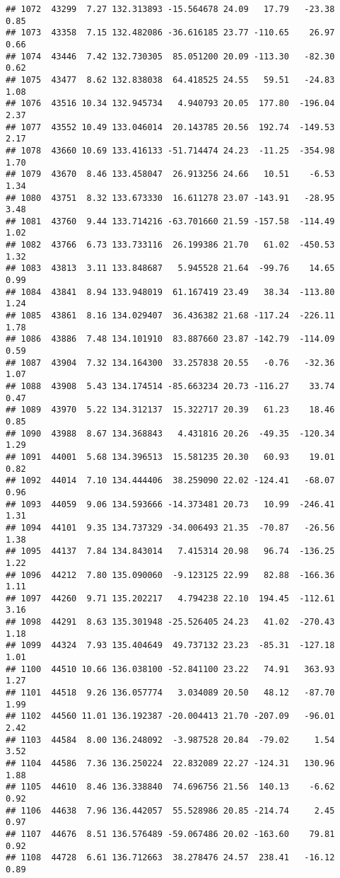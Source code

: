 \documentclass[]{article}
\begin{document}
\begin{verbatim}
## 1072  43299  7.27 132.313893 -15.564678 24.09   17.79   -23.38  0.85
## 1073  43358  7.15 132.482086 -36.616185 23.77 -110.65    26.97  0.66
## 1074  43446  7.42 132.730305  85.051200 20.09 -113.30   -82.30  0.62
## 1075  43477  8.62 132.838038  64.418525 24.55   59.51   -24.83  1.08
## 1076  43516 10.34 132.945734   4.940793 20.05  177.80  -196.04  2.37
## 1077  43552 10.49 133.046014  20.143785 20.56  192.74  -149.53  2.17
## 1078  43660 10.69 133.416133 -51.714474 24.23  -11.25  -354.98  1.70
## 1079  43670  8.46 133.458047  26.913256 24.66   10.51    -6.53  1.34
## 1080  43751  8.32 133.673330  16.611278 23.07 -143.91   -28.95  3.48
## 1081  43760  9.44 133.714216 -63.701660 21.59 -157.58  -114.49  1.02
## 1082  43766  6.73 133.733116  26.199386 21.70   61.02  -450.53  1.32
## 1083  43813  3.11 133.848687   5.945528 21.64  -99.76    14.65  0.99
## 1084  43841  8.94 133.948019  61.167419 23.49   38.34  -113.80  1.24
## 1085  43861  8.16 134.029407  36.436382 21.68 -117.24  -226.11  1.78
## 1086  43886  7.48 134.101910  83.887660 23.87 -142.79  -114.09  0.59
## 1087  43904  7.32 134.164300  33.257838 20.55   -0.76   -32.36  1.07
## 1088  43908  5.43 134.174514 -85.663234 20.73 -116.27    33.74  0.47
## 1089  43970  5.22 134.312137  15.322717 20.39   61.23    18.46  0.85
## 1090  43988  8.67 134.368843   4.431816 20.26  -49.35  -120.34  1.29
## 1091  44001  5.68 134.396513  15.581235 20.30   60.93    19.01  0.82
## 1092  44014  7.10 134.444406  38.259090 22.02 -124.41   -68.07  0.96
## 1093  44059  9.06 134.593666 -14.373481 20.73   10.99  -246.41  1.31
## 1094  44101  9.35 134.737329 -34.006493 21.35  -70.87   -26.56  1.38
## 1095  44137  7.84 134.843014   7.415314 20.98   96.74  -136.25  1.22
## 1096  44212  7.80 135.090060  -9.123125 22.99   82.88  -166.36  1.11
## 1097  44260  9.71 135.202217   4.794238 22.10  194.45  -112.61  3.16
## 1098  44291  8.63 135.301948 -25.526405 24.23   41.02  -270.43  1.18
## 1099  44324  7.93 135.404649  49.737132 23.23  -85.31  -127.18  1.01
## 1100  44510 10.66 136.038100 -52.841100 23.22   74.91   363.93  1.27
## 1101  44518  9.26 136.057774   3.034089 20.50   48.12   -87.70  1.99
## 1102  44560 11.01 136.192387 -20.004413 21.70 -207.09   -96.01  2.42
## 1103  44584  8.00 136.248092  -3.987528 20.84  -79.02     1.54  3.52
## 1104  44586  7.36 136.250224  22.832089 22.27 -124.31   130.96  1.88
## 1105  44610  8.46 136.338840  74.696756 21.56  140.13    -6.62  0.92
## 1106  44638  7.96 136.442057  55.528986 20.85 -214.74     2.45  0.97
## 1107  44676  8.51 136.576489 -59.067486 20.02 -163.60    79.81  0.92
## 1108  44728  6.61 136.712663  38.278476 24.57  238.41   -16.12  0.89

\end{verbatim}
\end{document}
